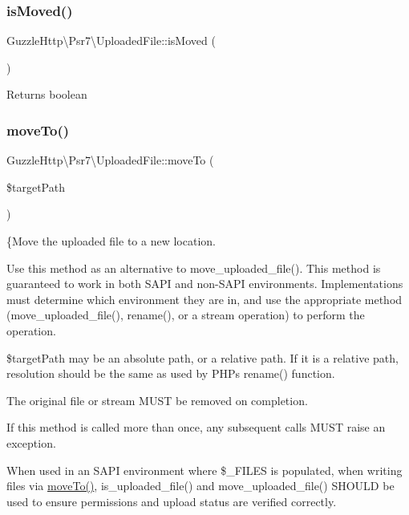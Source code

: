 \subsubsection{\texorpdfstring{is\+Moved()}{isMoved()}}
{\footnotesize\ttfamily Guzzle\+Http\textbackslash{}\+Psr7\textbackslash{}\+Uploaded\+File\+::is\+Moved (\begin{DoxyParamCaption}{ }\end{DoxyParamCaption})}

\begin{DoxyReturn}{Returns}
boolean 
\end{DoxyReturn}
\mbox{\label{classGuzzleHttp_1_1Psr7_1_1UploadedFile_a5279b64228742deb9e0ba074df4d0d8e}} 
\subsubsection{\texorpdfstring{move\+To()}{moveTo()}}
{\footnotesize\ttfamily Guzzle\+Http\textbackslash{}\+Psr7\textbackslash{}\+Uploaded\+File\+::move\+To (\begin{DoxyParamCaption}\item[{}]{\$target\+Path }\end{DoxyParamCaption})}

\{Move the uploaded file to a new location.

Use this method as an alternative to move\+\_\+uploaded\+\_\+file(). This method is guaranteed to work in both S\+A\+PI and non-\/\+S\+A\+PI environments. Implementations must determine which environment they are in, and use the appropriate method (move\+\_\+uploaded\+\_\+file(), rename(), or a stream operation) to perform the operation.

\$target\+Path may be an absolute path, or a relative path. If it is a relative path, resolution should be the same as used by P\+HP\textquotesingle{}s rename() function.

The original file or stream M\+U\+ST be removed on completion.

If this method is called more than once, any subsequent calls M\+U\+ST raise an exception.

When used in an S\+A\+PI environment where \$\+\_\+\+F\+I\+L\+ES is populated, when writing files via \hyperlink{interfacePsr_1_1Http_1_1Message_1_1UploadedFileInterface_aac862c26ca280245c0fb197d0266fdf4}{move\+To()}, is\+\_\+uploaded\+\_\+file() and move\+\_\+uploaded\+\_\+file() S\+H\+O\+U\+LD be used to ensure permissions and upload status are verified correctly.

